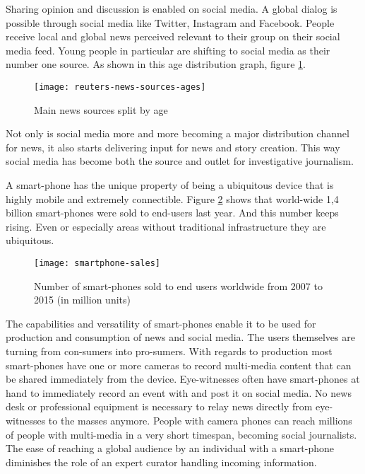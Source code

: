 Sharing opinion and discussion is enabled on social media.
A global dialog is possible through social media like Twitter, Instagram and Facebook.
People receive local and global news perceived relevant to their group on their social media feed.
Young people in particular are shifting to social media as their number one source. \cite{reuters_social_media}
As shown in this age distribution graph, figure \ref{fig:reuters-news-sources-ages}.
\begin{figure}[H]
	\centering
	\texttt{[image: reuters-news-sources-ages]}
	\caption{Main news sources split by age \cite{reuters_social_media}}
	\label{fig:reuters-news-sources-ages}
\end{figure}
Not only is social media more and more becoming a major distribution channel for news, it also starts delivering input for news and story creation.
This way social media has become both the source and outlet for investigative journalism.

A smart-phone has the unique property of being a ubiquitous device that is highly mobile and extremely connectible.
Figure \ref{fig:smartphone-sales} shows that world-wide 1,4 billion smart-phones were sold to end-users last year.
And this number keeps rising.
Even or especially areas without traditional infrastructure they are ubiquitous.
\begin{figure}[H]
	\centering
	\texttt{[image: smartphone-sales]}
	\caption{Number of smart-phones sold to end users worldwide from 2007 to 2015 (in million units) \cite{smartphone-sales}}
	\label{fig:smartphone-sales}
\end{figure}

The capabilities and versatility of smart-phones enable it to be used for production and consumption of news and social media.
The users themselves are turning from con-sumers into pro-sumers.
With regards to production most smart-phones have one or more cameras to record multi-media content that can be shared immediately from the device.
Eye-witnesses often have smart-phones at hand to immediately record an event with and post it on social media.
No news desk or professional equipment is necessary to relay news directly from eye-witnesses to the masses anymore.
People with camera phones can reach millions of people with multi-media in a very short timespan, becoming social journalists.
The ease of reaching a global audience by an individual with a smart-phone diminishes the role of an expert curator handling incoming information.

